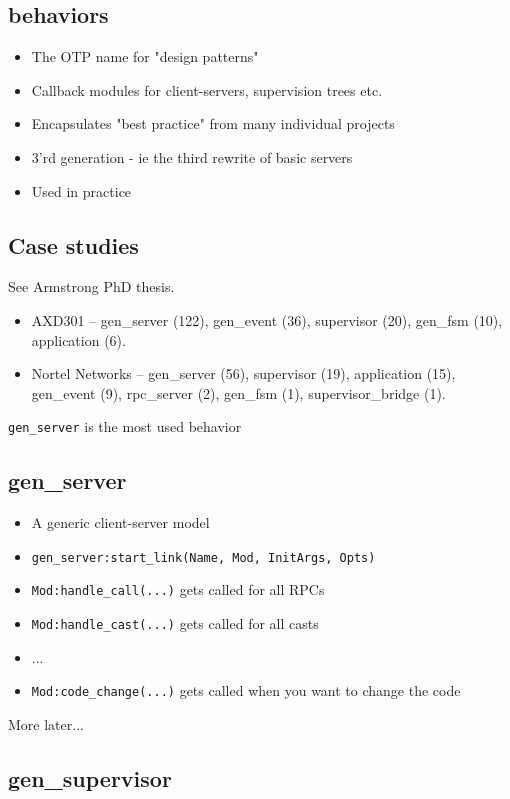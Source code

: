\documentclass[12pt]{article}
\begin{document}
\subsection{behaviors}

\begin{itemize}
\item The OTP name for "design patterns"
\item Callback modules for client-servers, supervision trees etc.
\item Encapsulates "best practice" from many individual projects
\item 3'rd generation - ie the third rewrite of basic servers
\item Used in practice
\end{itemize}

\subsection{Case studies}
See Armstrong PhD thesis.
\begin{itemize}
\item AXD301 -- gen\_server (122), gen\_event (36), supervisor (20), gen\_fsm
(10), application (6).  
\item Nortel Networks -- gen\_server (56),
supervisor (19), application (15), gen\_event (9), rpc\_server (2),
gen\_fsm (1), supervisor\_bridge (1).
\end{itemize}

\verb+gen_server+ is the most used behavior

\subsection{gen\_server}

\begin{itemize}
\item A generic client-server model
\item \verb+gen_server:start_link(Name, Mod, InitArgs, Opts)+
\item \verb+Mod:handle_call(...)+ gets called for all RPCs
\item \verb+Mod:handle_cast(...)+ gets called for all casts
\item ...
\item \verb+Mod:code_change(...)+ gets called when you want to change the code
\end{itemize}

More later...

\subsection{gen\_supervisor}
\end{document}
